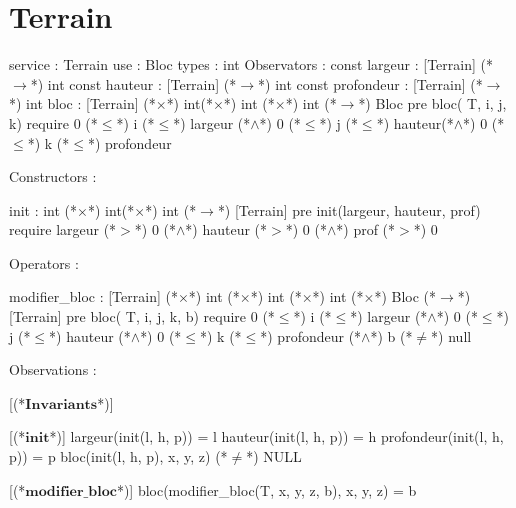 \documentclass[a4paper, 11pt]{report}
\newcommand{\specB}[1]{\textbf{#1}}
\begin{document}
\section{Terrain}
\begin{Spe}
service : Terrain
use : Bloc
types : int
Observators :
	const largeur : [Terrain] (*$\rightarrow$*) int
	const hauteur : [Terrain] (*$\rightarrow$*) int
	const profondeur : [Terrain] (*$\rightarrow$*) int
	bloc : [Terrain] (*$\times$*) int(*$\times$*) int (*$\times$*) int (*$\rightarrow$*) Bloc
		pre bloc( T, i, j, k) require 0 (*$\leq$*) i (*$\leq$*) largeur (*$\land$*) 0 (*$\leq$*) j (*$\leq$*) hauteur(*$\land$*) 0 (*$\leq$*) k (*$\leq$*) profondeur
             
Constructors :

	init : int (*$\times$*) int(*$\times$*) int (*$\rightarrow$*) [Terrain]
		pre init(largeur, hauteur, prof) require largeur (*$>$*) 0 (*$\land$*) hauteur (*$>$*) 0 (*$\land$*) prof (*$>$*) 0
             
Operators : 

	modifier_bloc : [Terrain] (*$\times$*) int (*$\times$*) int (*$\times$*) int (*$\times$*) Bloc (*$\rightarrow$*) [Terrain]
		pre bloc( T, i, j, k, b) require 0 (*$\leq$*) i (*$\leq$*) largeur (*$\land$*) 0 (*$\leq$*) j (*$\leq$*) hauteur (*$\land$*) 0 (*$\leq$*) k (*$\leq$*) profondeur (*$\land$*) b (*$\neq$*) null
             
Observations :

      [(*$\specB{Invariants}$*)]
      
      [(*$\specB{init}$*)]
            largeur(init(l, h, p)) = l
            hauteur(init(l, h, p)) = h
            profondeur(init(l, h, p)) = p
            bloc(init(l, h, p), x, y, z) (*$\neq$*) NULL
            
      [(*$\specB{modifier\_bloc}$*)]
            bloc(modifier_bloc(T, x, y, z, b), x, y, z) = b 
            
\end{Spe}
\end{document}
